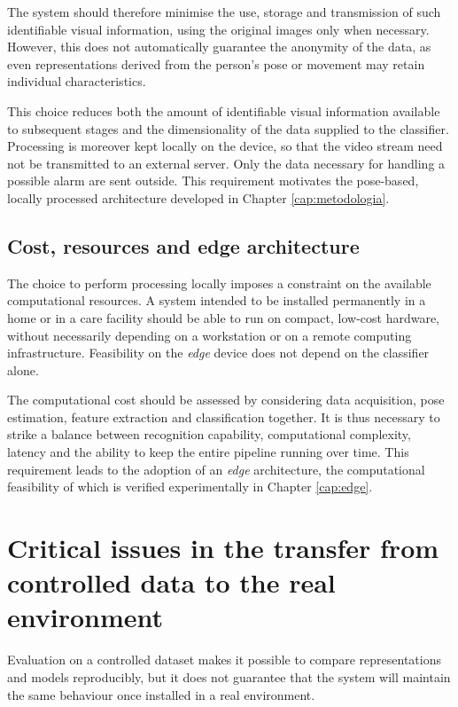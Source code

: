 The system should therefore minimise the use, storage and transmission of such identifiable visual information, using the original images only when necessary. However, this does not automatically guarantee the anonymity of the data, as even representations derived from the person's pose or movement may retain individual characteristics.

This choice reduces both the amount of identifiable visual information available to subsequent stages and the dimensionality of the data supplied to the classifier. Processing is moreover kept locally on the device, so that the video stream need not be transmitted to an external server. Only the data necessary for handling a possible alarm are sent outside.
This requirement motivates the pose-based, locally processed architecture developed in Chapter \ref{cap:metodologia}. 

\subsection{Cost, resources and edge architecture}

The choice to perform processing locally imposes a constraint on the available computational resources. A system intended to be installed permanently in a home or in a care facility should be able to run on compact, low-cost hardware, without necessarily depending on a workstation or on a remote computing infrastructure. Feasibility on the \emph{edge} device does not depend on the classifier alone. 

The computational cost should be assessed by considering data acquisition, pose estimation, feature extraction and classification together. 
It is thus necessary to strike a balance between recognition capability, computational complexity, latency and the ability to keep the entire pipeline running over time. This requirement leads to the adoption of an \emph{edge} architecture, the computational feasibility of which is verified experimentally in Chapter \ref{cap:edge}.

\section{Critical issues in the transfer from controlled data to the real
environment}

Evaluation on a controlled dataset makes it possible to compare
representations and models reproducibly, but it does not guarantee that the
system will maintain the same behaviour once installed in a real environment.

